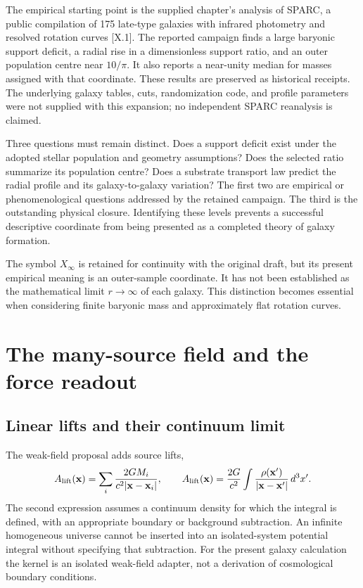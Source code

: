 The empirical starting point is the supplied chapter's analysis of SPARC, a public compilation of 175 late-type galaxies with infrared photometry and resolved rotation curves [X.1]. The reported campaign finds a large baryonic support deficit, a radial rise in a dimensionless support ratio, and an outer population centre near $10/\pi$. It also reports a near-unity median for masses assigned with that coordinate. These results are preserved as historical receipts. The underlying galaxy tables, cuts, randomization code, and profile parameters were not supplied with this expansion; no independent SPARC reanalysis is claimed.

Three questions must remain distinct. Does a support deficit exist under the adopted stellar population and geometry assumptions? Does the selected ratio summarize its population centre? Does a substrate transport law predict the radial profile and its galaxy-to-galaxy variation? The first two are empirical or phenomenological questions addressed by the retained campaign. The third is the outstanding physical closure. Identifying these levels prevents a successful descriptive coordinate from being presented as a completed theory of galaxy formation.

The symbol $X_\infty$ is retained for continuity with the original draft, but its present empirical meaning is an outer-sample coordinate. It has not been established as the mathematical limit $r\to\infty$ of each galaxy. This distinction becomes essential when considering finite baryonic mass and approximately flat rotation curves.

\section{The many-source field and the force readout}
\subsection{Linear lifts and their continuum limit}

The weak-field proposal adds source lifts,
\begin{equation}
 A_{\rm lift}(\mathbf x)=\sum_i\frac{2GM_i}{c^2|\mathbf x-\mathbf x_i|},\qquad
 A_{\rm lift}(\mathbf x)=\frac{2G}{c^2}\int
 \frac{\rho(\mathbf x')}{|\mathbf x-\mathbf x'|}\,d^3x'.
 \label{c10:lift}
\end{equation}
The second expression assumes a continuum density for which the integral is defined, with an appropriate boundary or background subtraction. An infinite homogeneous universe cannot be inserted into an isolated-system potential integral without specifying that subtraction. For the present galaxy calculation the kernel is an isolated weak-field adapter, not a derivation of cosmological boundary conditions.

